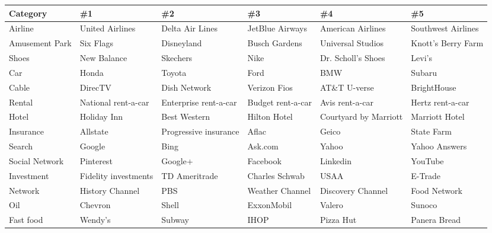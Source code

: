 \documentclass[a4paper,12pt,twoside,openright]{report}
\begin{document}
\begin{table}
\footnotesize
\begin{tabular}{l|lllll}
Category       & \#1                  & \#2                   & \#3               & \#4                   & \#5                \\ \hline
Airline        & United Airlines      & Delta Air Lines       & JetBlue Airways   & American Airlines     & Southwest Airlines \\
Amusement Park & Six Flags            & Disneyland            & Busch Gardens     & Universal Studios     & Knott's Berry Farm \\
Shoes          & New Balance          & Skechers              & Nike              & Dr. Scholl's Shoes    & Levi's             \\
Car            & Honda                & Toyota                & Ford              & BMW                   & Subaru             \\
Cable          & DirecTV              & Dish Network          & Verizon Fios      & AT\&T U-verse         & BrightHouse        \\
Rental         & National rent-a-car  & Enterprise rent-a-car & Budget rent-a-car & Avis rent-a-car       & Hertz rent-a-car   \\
Hotel          & Holiday Inn          & Best Western          & Hilton Hotel      & Courtyard by Marriott & Marriott Hotel     \\
Insurance      & Allstate             & Progressive insurance & Aflac             & Geico                 & State Farm         \\
Search         & Google               & Bing                  & Ask.com           & Yahoo                 & Yahoo Answers      \\
Social Network & Pinterest            & Google+               & Facebook          & Linkedin              & YouTube            \\
Investment     & Fidelity investments & TD Ameritrade         & Charles Schwab    & USAA                  & E-Trade            \\
Network        & History Channel      & PBS                   & Weather Channel   & Discovery Channel     & Food Network       \\
Oil            & Chevron              & Shell                 & ExxonMobil        & Valero                & Sunoco             \\
Fast food      & Wendy's              & Subway                & IHOP              & Pizza Hut             & Panera Bread       \\

\end{tabular}
\end{table}
\end{document}
